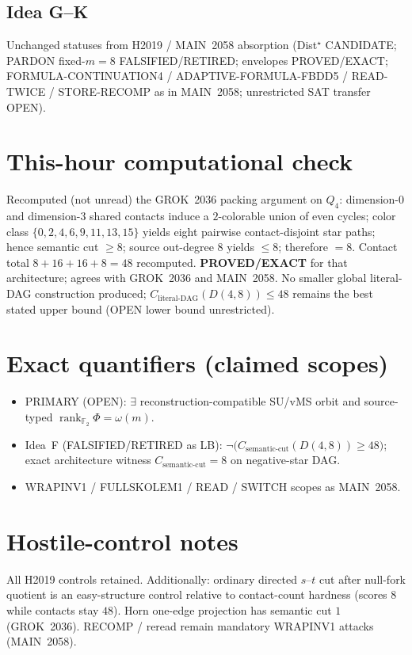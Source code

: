 \documentclass[11pt]{article}
\begin{document}
\subsection*{Idea G--K}
Unchanged statuses from H2019 / MAIN~2058 absorption
(Dist$^\star$ CANDIDATE; PARDON fixed-$m=8$ FALSIFIED/RETIRED; envelopes PROVED/EXACT;
FORMULA-CONTINUATION4 / ADAPTIVE-FORMULA-FBDD5 / READ-TWICE / STORE-RECOMP as in MAIN~2058;
unrestricted SAT transfer OPEN).

\section*{This-hour computational check}
Recomputed (not unread) the GROK~2036 packing argument on $Q_4$:
dimension-$0$ and dimension-$3$ shared contacts induce a $2$-colorable union of even cycles;
color class $\{0,2,4,6,9,11,13,15\}$ yields eight pairwise contact-disjoint star paths;
hence semantic cut $\ge8$; source out-degree $8$ yields $\le8$; therefore $=8$.
Contact total $8+16+16+8=48$ recomputed.
\textbf{PROVED/EXACT} for that architecture; agrees with GROK~2036 and MAIN~2058.
No smaller global literal-DAG construction produced; $C_{\mathrm{literal\textrm{-}DAG}}(D(4,8))\le48$ remains the best stated upper bound (OPEN lower bound unrestricted).

\section*{Exact quantifiers (claimed scopes)}
\begin{itemize}
\item PRIMARY (OPEN): $\exists$ reconstruction-compatible SU/vMS orbit and source-typed
  $\operatorname{rank}_{\mathbb F_2}\Phi=\omega(m)$.
\item Idea~F (FALSIFIED/RETIRED as LB): $\neg\bigl(C_{\mathrm{semantic\textrm{-}cut}}(D(4,8))\ge48\bigr)$;
  exact architecture witness $C_{\mathrm{semantic\textrm{-}cut}}=8$ on negative-star DAG.
\item WRAPINV1 / FULLSKOLEM1 / READ / SWITCH scopes as MAIN~2058.
\end{itemize}

\section*{Hostile-control notes}
All H2019 controls retained. Additionally: ordinary directed $s$--$t$ cut after null-fork
quotient is an easy-structure control relative to contact-count hardness (scores $8$ while
contacts stay $48$). Horn one-edge projection has semantic cut $1$ (GROK~2036).
RECOMP / reread remain mandatory WRAPINV1 attacks (MAIN~2058).
\end{document}
